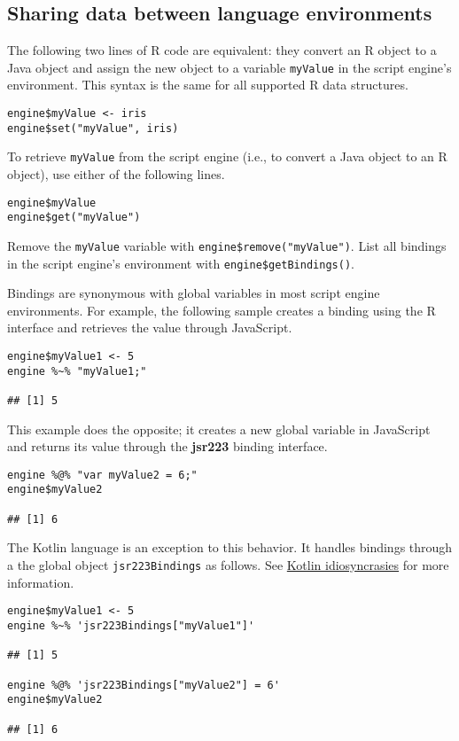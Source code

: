 \documentclass[
article,
11pt, %
a4paper, %
oneside, %
headinclude,footinclude, %
]{scrartcl}
\theoremstyle{definition} %
\theoremstyle{plain} %
\theoremstyle{remark} %
\newcommand{\pkg}[1]{\textbf{#1}}
\newcommand{\code}[1]{\texttt{#1}}
\begin{document}
\subsection{Sharing data between language environments}

The following two lines of R code are equivalent: they convert an R object to a Java object and assign the new object to a variable \code{myValue} in the script engine's environment. This syntax is the same for all supported R data structures.

\begin{verbatim}
engine$myValue <- iris
engine$set("myValue", iris)
\end{verbatim}

To retrieve \code{myValue} from the script engine (i.e., to convert a Java object to an R object), use either of the following lines.

\begin{verbatim}
engine$myValue
engine$get("myValue")
\end{verbatim}

Remove the \code{myValue} variable with \code{engine\$remove("myValue")}. List all bindings in the script engine's environment with \code{engine\$getBindings()}.

Bindings are synonymous with global variables in most script engine environments. For example, the following sample creates a binding using the R interface and retrieves the value through JavaScript.

\begin{verbatim}
engine$myValue1 <- 5
engine %~% "myValue1;"

## [1] 5
\end{verbatim}
This example does the opposite; it creates a new global variable in JavaScript and returns its value through the \pkg{jsr223} binding interface.
\begin{verbatim}
engine %@% "var myValue2 = 6;"
engine$myValue2

## [1] 6
\end{verbatim}
The Kotlin language is an exception to this behavior. It handles bindings through a the global object \code{jsr223Bindings} as follows. See \hyperlink{kotlin-idiosyncrasies}{Kotlin idiosyncrasies} for more information.

\begin{verbatim}
engine$myValue1 <- 5
engine %~% 'jsr223Bindings["myValue1"]'

## [1] 5

engine %@% 'jsr223Bindings["myValue2"] = 6'
engine$myValue2

## [1] 6
\end{verbatim}
\end{document}
